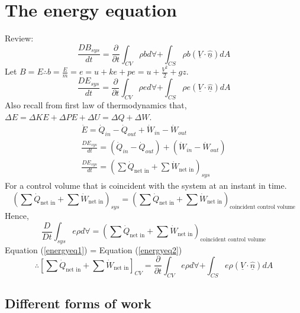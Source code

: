 \documentclass[class=report, crop=false, 12pt,a4paper]{standalone}
\begin{document}
\section{The energy equation}
Review:
\begin{equation}
  \frac{DB_{sys}}{dt} = \frac{\partial}{\partial t} \int_{CV} \rho b d \forall + \int_{CS} \rho b (\underline{V}\cdot \underline{\hat{n}}) dA
\end{equation}
Let $B=E \therefore b = \frac{E}{m} = e = u + ke + pe = u + \frac{V^2}{2} + gz$.
\begin{equation}
  \frac{DE_{sys}}{dt} = \frac{\partial}{\partial t} \int_{CV} \rho e d \forall + \int_{CS} \rho e (\underline{V}\cdot \underline{\hat{n}}) dA
\end{equation}
Also recall from first law of thermodynamics that, $\Delta E = \Delta KE + \Delta PE + \Delta U = \Delta Q + \Delta W$.
\begin{gather}
  \dot{E} = \dot{Q}_{in} - \dot{Q}_{out} + \dot{W}_{in} - \dot{W}_{out}\\
  \frac{DE_{sys}}{dt} = (\dot{Q}_{in} - \dot{Q}_{out}) + (\dot{W}_{in} - \dot{W}_{out})\\
  \frac{DE_{sys}}{dt} = \left( \sum \dot{Q}_{\textrm{net in}} + \sum \dot{W}_{\textrm{net in}} \right)_{sys} \label{energyeq1}
\end{gather}
For a control volume that is coincident with the system at an instant in time.
\begin{equation}
  \left( \sum \dot{Q}_{\textrm{net in}} + \sum \dot{W}_{\textrm{net in}} \right)_{sys} = \left( \sum \dot{Q}_{\textrm{net in}} + \sum \dot{W}_{\textrm{net in}} \right)_{\textrm{coincident control volume}}
\end{equation}
Hence,
\begin{equation}
  \frac{D}{Dt} \int_{sys} e \rho d \forall = \left( \sum \dot{Q}_{\textrm{net in}} + \sum \dot{W}_{\textrm{net in}} \right)_{\textrm{coincident control volume}} \label{energyeq2}
\end{equation}
Equation (\ref{energyeq1}) = Equation (\ref{energyeq2})
\begin{equation}
  \therefore \left[ \sum \dot{Q}_{\textrm{net in}} + \sum \dot{W}_{\textrm{net in}} \right]_{CV} = \frac{\partial}{\partial t} \int_{CV} e \rho d \forall + \int_{CS} e \rho (\underline{V} \cdot \underline{\hat{n}}) dA \label{energyeq3}
\end{equation}
\subsection{Different forms of work}
\end{document}
